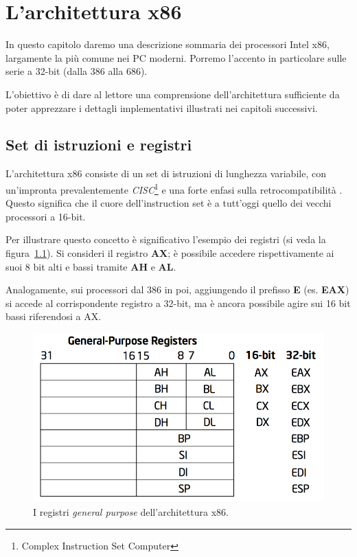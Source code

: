 \documentclass[12pt,a4paper]{report}
\begin{document}
\chapter{L'architettura x86}
	In questo capitolo daremo una descrizione sommaria dei processori Intel x86, largamente la più comune nei PC moderni.
	Porremo l'accento in particolare sulle serie a 32-bit (dalla 386 alla 686).
	
	L'obiettivo è di dare al lettore una comprensione dell'architettura sufficiente da poter apprezzare i dettagli implementativi
	illustrati nei capitoli successivi.
	
	\section{Set di istruzioni e registri}		
		L'architettura x86 consiste di un set di istruzioni di lunghezza variabile, con un'impronta prevalentemente
		\emph{CISC}\footnote{Complex Instruction Set Computer} e una forte enfasi sulla retrocompatibilità \cite{WIKI_x86}.
		Questo significa che il cuore dell'instruction set è a tutt'oggi quello dei vecchi processori a 16-bit.
		
		Per illustrare questo concetto è significativo l'esempio dei registri (si veda la figura~\ref{fig:gpr}).
		Si consideri il registro \textbf{AX}; è possibile accedere rispettivamente ai suoi 8 bit alti e bassi tramite \textbf{AH} e \textbf{AL}.
		
		Analogamente, sui processori dal 386 in poi, aggiungendo il prefisso \textbf{E} (es. \textbf{EAX}) si accede al corrispondente
		registro a 32-bit, ma è ancora possibile agire sui 16 bit bassi riferendosi a AX.
		
		\begin{figure}[t!]
		\centering
		\includegraphics[scale=0.53]{img/gpr.png}
		\caption{I registri \emph{general purpose} dell'architettura x86. \cite{Intel}\label{fig:gpr}}
		\end{figure}
		
\end{document}
